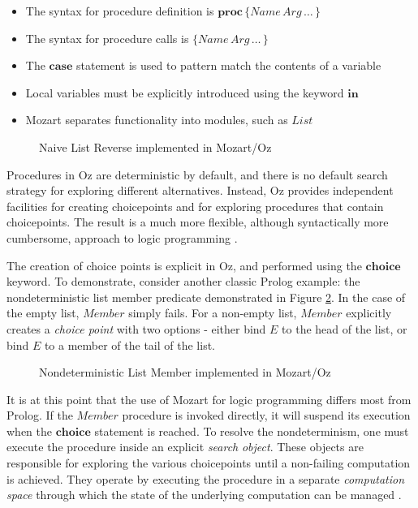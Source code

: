 \begin{itemize}
\item The syntax for procedure definition is $\mathbf{proc}\,\{Name\, Arg\,\dots\,\}$ 
\item The syntax for procedure calls is $\{Name\, Arg\,\dots\,\}$ 
\item The $\mathbf{case}$ statement is used to pattern match the contents
of a variable 
\item Local variables must be explicitly introduced using the keyword $\mathbf{in}$ 
\item Mozart separates functionality into modules, such as $List$ 
\end{itemize}
%
\begin{figure}[t]

\caption{Naive List Reverse implemented in Mozart/Oz\label{fig:Background:Naive-List-Reverse}}

\end{figure}


Procedures in Oz are deterministic by default, and there is no
default search strategy for exploring different alternatives. Instead,
Oz provides independent facilities for creating choicepoints and
for exploring procedures that contain choicepoints. The result is
a much more flexible, although syntactically more cumbersome, approach
to logic programming \citep{lpinoz99}.

The creation of choice points is explicit in Oz, and performed
using the $\mathbf{choice}$ keyword. To demonstrate, consider another
classic Prolog example: the nondeterministic list member predicate
demonstrated in Figure \ref{fig:Background:Nondet-Member}. In the
case of the empty list, $Member$ simply fails. For a non-empty list,
$Member$ explicitly creates a \emph{choice point} with two options
- either bind $E$ to the head of the list, or bind $E$ to a member
of the tail of the list.

%
\begin{figure}[t]

\caption{Nondeterministic List Member implemented in Mozart/Oz\label{fig:Background:Nondet-Member}}

\end{figure}


It is at this point that the use of Mozart for logic programming differs
most from Prolog. If the $Member$ procedure is invoked directly,
it will suspend its execution when the $\mathbf{choice}$ statement
is reached. To resolve the nondeterminism, one must execute the procedure
inside an explicit \emph{search} \emph{object}. These objects are
responsible for exploring the various choicepoints until a non-failing
computation is achieved. They operate by executing the procedure in
a separate \emph{computation space} through which the state of the
underlying computation can be managed \citep{schulte00constraint_services}.

